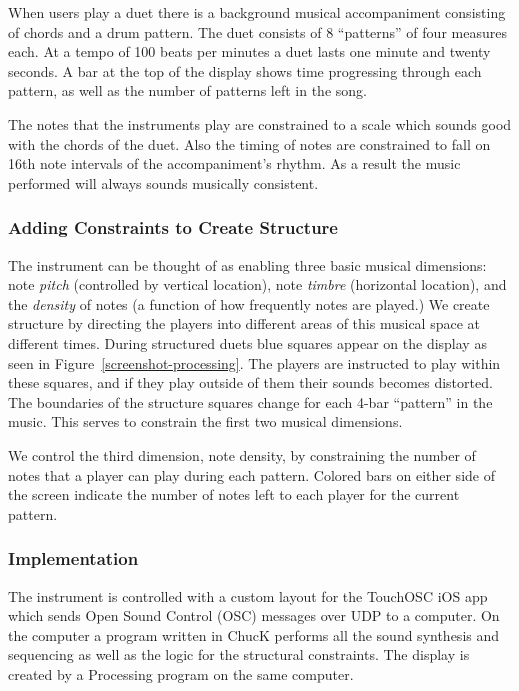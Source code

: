 \documentclass{article}
\begin{document}
When users play a duet there is a background musical accompaniment consisting of chords and a drum pattern.  The duet consists of 8 ``patterns'' of four measures each.  At a tempo of 100 beats per minutes a duet lasts one minute and twenty seconds.  A bar at the top of the display shows time progressing through each pattern, as well as the number of patterns left in the song.  

The notes that the instruments play are constrained to a scale which sounds good with the chords of the duet.  Also the timing of notes are constrained to fall on 16th note intervals of the accompaniment's rhythm.  As a result the music performed will always sounds musically consistent.

\subsubsection{Adding Constraints to Create Structure}

The instrument can be thought of as enabling three basic musical dimensions: note \emph{pitch} (controlled by vertical location), note \emph{timbre} (horizontal location), and the \emph{density} of notes (a function of how frequently notes are played.)  We create structure by directing the players into different areas of this musical space at different times. During structured duets blue squares appear on the display as seen in Figure~\ref{screenshot-processing}.  The players are instructed to play within these squares, and if they play outside of them their sounds becomes distorted. The boundaries of the structure squares change for each 4-bar “pattern” in the music. This serves to constrain the first two musical dimensions.

We control the third dimension, note density, by constraining the number of notes that a player can play during each pattern. Colored bars on either side of the screen indicate the number of notes left to each player for the current pattern.


\subsubsection{Implementation}

The instrument is controlled with a custom layout for the TouchOSC iOS app which sends Open Sound Control (OSC) messages over UDP to a computer.  On the computer a program written in ChucK performs all the sound synthesis and sequencing as well as the logic for the structural constraints. The display is created by a Processing program on the same computer.
\end{document}
